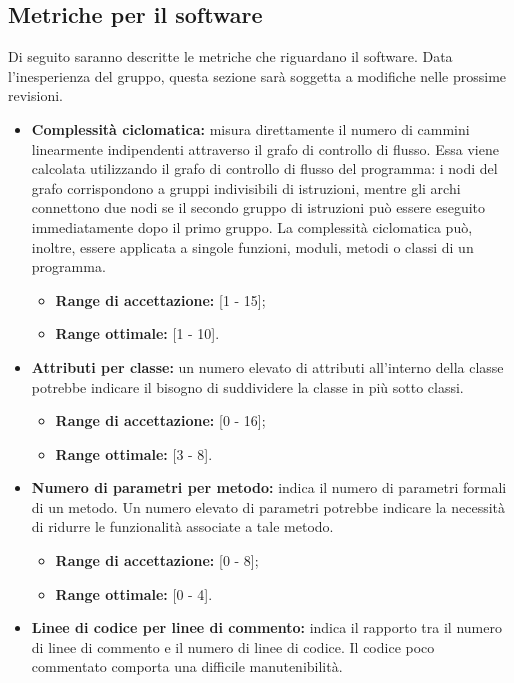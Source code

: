 \subsection{Metriche per il software}
Di seguito saranno descritte le metriche che riguardano il software. Data l'inesperienza del gruppo, questa sezione sarà soggetta a modifiche nelle prossime revisioni.
\begin{itemize}
	\item \textbf{Complessità ciclomatica:} misura direttamente il numero di cammini linearmente indipendenti attraverso il grafo di controllo di flusso. Essa viene calcolata utilizzando il grafo di controllo di flusso del programma: i nodi del grafo corrispondono a gruppi indivisibili di istruzioni, mentre gli archi connettono due nodi se il secondo gruppo di istruzioni può essere eseguito immediatamente dopo il primo gruppo. La complessità ciclomatica può, inoltre, essere applicata a singole funzioni, moduli, metodi o classi di un programma.
	\begin{itemize}
		\item \textbf{Range di accettazione:} [1 - 15];
		\item \textbf{Range ottimale:} [1 - 10].
	\end{itemize}
	\item \textbf{Attributi per classe:} un numero elevato di attributi all'interno della classe potrebbe indicare il bisogno di suddividere la classe in più sotto classi.
	\begin{itemize}
		\item \textbf{Range di accettazione:} [0 - 16];
		\item \textbf{Range ottimale:} [3 - 8].
	\end{itemize}
	\item \textbf{Numero di parametri per metodo:} indica il numero di parametri formali di un metodo. Un numero elevato di parametri potrebbe indicare la necessità di ridurre le funzionalità associate a tale metodo.
	\begin{itemize}
		\item \textbf{Range di accettazione:} [0 - 8];
		\item \textbf{Range ottimale:} [0 - 4].
	\end{itemize}
	\item \textbf{Linee di codice per linee di commento:} indica il rapporto tra il numero di linee di commento e il numero di linee di codice. Il codice poco commentato comporta una difficile manutenibilità.
	\begin{itemize}

\end{itemize}
\end{itemize}
